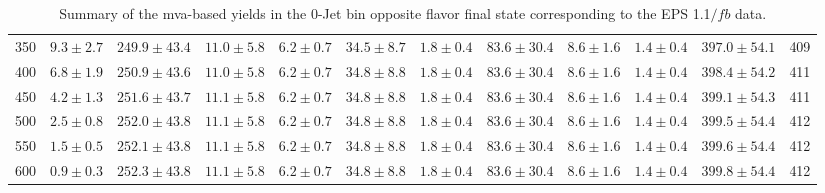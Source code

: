 \begin{table}
{\begin{center}
\begin{tabular}{l c c c c c c c c c c c }
350 & $9.3\pm2.7$ & $249.9\pm43.4$ & $11.0\pm5.8$ & $6.2\pm0.7$ & $34.5\pm8.7$ & $1.8\pm0.4$ & $83.6\pm30.4$ & $8.6\pm1.6$ & $1.4\pm0.4$ & $397.0\pm54.1$ & 409 \\
400 & $6.8\pm1.9$ & $250.9\pm43.6$ & $11.0\pm5.8$ & $6.2\pm0.7$ & $34.8\pm8.8$ & $1.8\pm0.4$ & $83.6\pm30.4$ & $8.6\pm1.6$ & $1.4\pm0.4$ & $398.4\pm54.2$ & 411 \\
450 & $4.2\pm1.3$ & $251.6\pm43.7$ & $11.1\pm5.8$ & $6.2\pm0.7$ & $34.8\pm8.8$ & $1.8\pm0.4$ & $83.6\pm30.4$ & $8.6\pm1.6$ & $1.4\pm0.4$ & $399.1\pm54.3$ & 411 \\
500 & $2.5\pm0.8$ & $252.0\pm43.8$ & $11.1\pm5.8$ & $6.2\pm0.7$ & $34.8\pm8.8$ & $1.8\pm0.4$ & $83.6\pm30.4$ & $8.6\pm1.6$ & $1.4\pm0.4$ & $399.5\pm54.4$ & 412 \\
550 & $1.5\pm0.5$ & $252.1\pm43.8$ & $11.1\pm5.8$ & $6.2\pm0.7$ & $34.8\pm8.8$ & $1.8\pm0.4$ & $83.6\pm30.4$ & $8.6\pm1.6$ & $1.4\pm0.4$ & $399.6\pm54.4$ & 412 \\
600 & $0.9\pm0.3$ & $252.3\pm43.8$ & $11.1\pm5.8$ & $6.2\pm0.7$ & $34.8\pm8.8$ & $1.8\pm0.4$ & $83.6\pm30.4$ & $8.6\pm1.6$ & $1.4\pm0.4$ & $399.8\pm54.4$ & 412 \\
\hline
\end{tabular}
\end{center}
}
\caption{Summary of the mva-based yields in the 0-Jet bin opposite flavor final state corresponding to the EPS 1.1$/fb$ data.}
\end{table}
